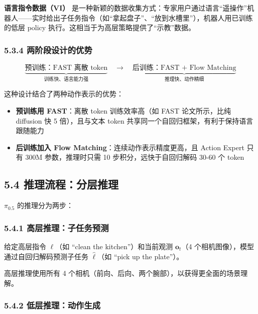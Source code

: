 \documentclass[
  chinese,
]{ctexart}
\providecommand{\tightlist}{%
  \setlength{\itemsep}{0pt}\setlength{\parskip}{0pt}}
\begin{document}
\textbf{语言指令数据（VI）}
是一种新颖的数据收集方式：专家用户通过语言``遥操作''机器人------实时给出子任务指令（如``拿起盘子''、``放到水槽里''），机器人用已训练的低层
policy 执行。这相当于为高层策略提供了``示教''数据。

\subsubsection{5.3.4
两阶段设计的优势}\label{ux4e24ux9636ux6bb5ux8bbeux8ba1ux7684ux4f18ux52bf}

\[
\underbrace{\text{预训练：FAST 离散 token}}_{\text{训练快、语言能力强}} \quad\longrightarrow\quad \underbrace{\text{后训练：FAST + Flow Matching}}_{\text{推理快、动作精细}}
\]

这种设计结合了两种动作表示的优势：

\begin{itemize}
\tightlist
\item
  \textbf{预训练用 FAST}：离散 token 训练效率高（如 FAST 论文所示，比纯
  diffusion 快 5 倍），且与文本 token
  共享同一个自回归框架，有利于保持语言跟随能力
\item
  \textbf{后训练加入 Flow Matching}：连续动作表示精度更高，且 Action
  Expert 只有 300M 参数，推理时只需 10 步积分，远快于自回归解码 30-60 个
  token
\end{itemize}

\subsection{5.4
推理流程：分层推理}\label{ux63a8ux7406ux6d41ux7a0bux5206ux5c42ux63a8ux7406}

\(\pi_{0.5}\) 的推理分为两步：

\subsubsection{5.4.1
高层推理：子任务预测}\label{ux9ad8ux5c42ux63a8ux7406ux5b50ux4efbux52a1ux9884ux6d4b}

给定高层指令 \(\ell\)（如 ``clean the kitchen''）和当前观测
\(\mathbf{o}_t\)（4 个相机图像），模型通过自回归解码预测子任务
\(\hat{\ell}\)（如 ``pick up the plate''）。

高层推理使用所有 4
个相机（前向、后向、两个腕部），以获得更全面的场景理解。

\subsubsection{5.4.2
低层推理：动作生成}\label{ux4f4eux5c42ux63a8ux7406ux52a8ux4f5cux751fux6210}
\end{document}

